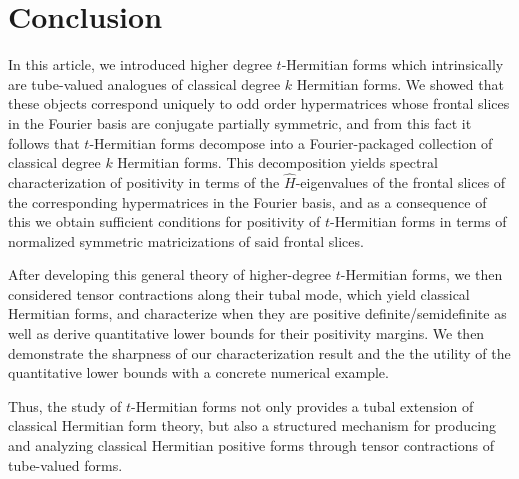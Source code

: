 \documentclass[11pt]{article}
\begin{document}
\section{Conclusion}
In this article, we introduced higher degree $t$-Hermitian forms which intrinsically are tube-valued analogues of classical degree $k$ Hermitian forms. We showed that these objects correspond uniquely to odd order hypermatrices whose frontal slices in the Fourier basis are conjugate partially symmetric, and from this fact it follows that $t$-Hermitian forms decompose into a Fourier-packaged collection of classical degree $k$ Hermitian forms. This decomposition yields spectral characterization of positivity in terms of the $\widehat{H}$-eigenvalues of the frontal slices of the corresponding hypermatrices in the Fourier basis, and as a consequence of this we obtain sufficient conditions for positivity of $t$-Hermitian forms in terms of normalized symmetric matricizations of said frontal slices. 

After developing this general theory of higher-degree $t$-Hermitian forms, we then considered tensor contractions along their tubal mode, which yield classical Hermitian forms, and characterize when they are positive definite/semidefinite as well as derive quantitative lower bounds for their positivity margins. We then demonstrate the sharpness of our characterization result and the the utility of the quantitative lower bounds with a concrete numerical example. 

Thus, the study of $t$-Hermitian forms not only provides a tubal extension of classical Hermitian form theory, but also a structured mechanism for producing and analyzing classical Hermitian positive forms through tensor contractions of tube-valued forms. 


\appendix
\end{document}
